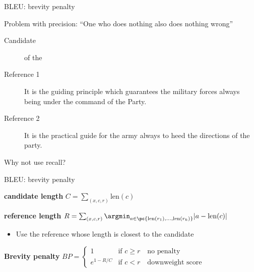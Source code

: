 \documentclass[usenames,dvipsnames,notes,11pt,aspectratio=169,hyperref={colorlinks=true, linkcolor=blue}]{beamer}
\newcommand{\pdfnote}[1]{}
\begin{document}
\begin{frame}
    {BLEU: brevity penalty}

    Problem with precision: ``One who does nothing also does nothing wrong''

    \begin{description}
        \item[Candidate] of the 
        \item[Reference 1] It is the guiding principle which guarantees the military forces always being under the command of the Party. 
        \item[Reference 2] It is the practical guide for the army always to heed the directions of the party.
    \end{description}

    Why not use recall? %
    \pdfnote{
       BLEU does not use recall because the notion of recall is unclear when simultaneously matching against multiple reference translations (rather than a single reference).  
    }
\end{frame}

\begin{frame}
    {BLEU: brevity penalty}


    \textbf{candidate length} $C=\sum_{(x,c,r)} \text{len}(c)$

    \textbf{reference length} $R=\sum_{(x,c,r)} \argmin_{a\in\pc{\text{len}(r_1),\ldots,\text{len}(r_k)}} |a-\text{len}(c)|$\\
    \begin{itemize}
        \item Use the reference whose length is closest to the candidate
    \end{itemize}

    \textbf{Brevity penalty} $BP =
    \begin{cases}
        1 & \text{if } c \ge r \quad \text{no penalty}\\
        e^{1-R/C} & \text{if } c < r \quad \text{downweight score}
    \end{cases}
    $
\end{frame}
\end{document}
